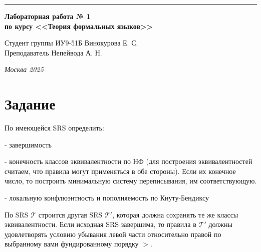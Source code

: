 \documentclass[a4paper, 14pt]{extarticle}
\begin{document}
\begin{titlepage}
\vspace*{-16pt}
\hspace{30pt}\rule{0.866\textwidth}{0.4pt}
  
\vspace{11em}

\begin{center}
\Large {\bf Лабораторная работа № 1} \\ 
\large {\bf по курсу <<Теория формальных языков>>} \\ 
\end{center}\normalsize

\vspace{8em}


\begin{flushright}
  {Студент группы ИУ9-51Б Винокурова Е. С.\hspace*{15pt} \\
  \vspace{2ex}
  Преподаватель Непейвода А. Н.\hspace*{15pt}}
\end{flushright}

\bigskip

\vfill
 

\begin{center}
\textsl{Москва 2025}
\end{center}
\end{titlepage}


\renewcommand{\ttdefault}{pcr}

\setlength{\tabcolsep}{3pt}
\newpage
\setcounter{page}{2}
\section{Задание}

По имеющейся SRS определить:

- завершимость

- конечность классов эквивалентности по НФ (для построения эквивалентностей считаем, что правила могут применяться в обе стороны). Если их конечное число, то построить минимальную систему переписывания, им соответствующую.

- локальную конфлюэнтность и пополняемость по Кнуту-Бендиксу

По SRS $\mathcal{T}$ строится другая SRS $\mathcal{T}'$, которая должна сохранять те же классы эквивалентности. Если исходная SRS завершима, то правила в $\mathcal{T}'$ должны удовлетворять условию убывания левой части относительно правой по выбранному вами фундированному порядку $>$.
\end{document}
